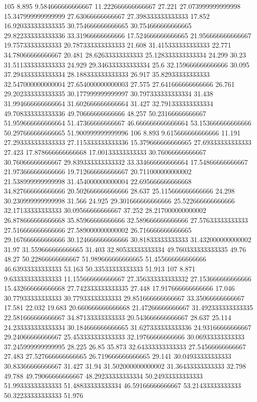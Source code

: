 105 8.895 9.584666666666667 11.222666666666667 27.221 27.073999999999998 15.347999999999999 27.63066666666667 27.398333333333333 17.852 16.920333333333335 30.754666666666665 30.754666666666665 29.822333333333336 33.31966666666666 17.524666666666665 21.956666666666667 19.75733333333333 20.787333333333333 21.608 31.415333333333333 22.771 34.78066666666667 20.481 28.62633333333333 25.128333333333334 24.299 30.23 31.511333333333333 24.929 29.346333333333334 25.6 32.159666666666666 30.095 37.294333333333334 28.188333333333333 26.917 35.82933333333333 32.547000000000004 27.654000000000003 27.575 27.641666666666666 26.761 29.202333333333335 30.177999999999997 30.797333333333334 31.438 31.994666666666664 31.602666666666664 31.427 32.791333333333334 49.708333333333336 49.70666666666666 48.257 50.23166666666667 51.959666666666664 51.47366666666667 46.666666666666664 53.153666666666666 50.297666666666665 51.900999999999996
106 8.893 9.615666666666666 11.191 27.293333333333333 27.115333333333336 15.379666666666665 27.69333333333333 27.423 17.878666666666668 17.00133333333333 30.76066666666667 30.76066666666667 29.839333333333332 33.334666666666664 17.54866666666667 21.973666666666666 19.712666666666667 20.711000000000002 21.538999999999998 31.454000000000004 22.695666666666668 34.827666666666666 20.502666666666666 28.637 25.115666666666666 24.298 30.230999999999998 31.566 24.925 29.301666666666666 25.522666666666666 32.17133333333333 30.09566666666667 37.252 28.217000000000002 26.878666666666668 35.85966666666666 32.589666666666666 27.57633333333333 27.516666666666666 27.589000000000002 26.716666666666665 29.167666666666666 30.124666666666666 30.81833333333333 31.432000000000002 31.97 31.559666666666665 31.403 32.80533333333334 49.760333333333335 49.76 48.27 50.22866666666667 51.989666666666665 51.455666666666666 46.63933333333333 53.163 50.33533333333333 51.913
107 8.871 9.633333333333333 11.155666666666667 27.356333333333332 27.153666666666666 15.432666666666668 27.742333333333335 27.448 17.917666666666666 17.046 30.77933333333333 30.77933333333333 29.851666666666667 33.35066666666667 17.581 22.032 19.683 20.660666666666668 21.47266666666667 31.492333333333335 22.581666666666667 34.87133333333333 20.543666666666667 28.637 25.114 24.233333333333334 30.184666666666665 31.627333333333336 24.93166666666667 29.24066666666667 25.453333333333333 32.19766666666666 30.06933333333333 37.245999999999995 28.225 26.85 35.873 32.64333333333333 27.54566666666667 27.483 27.527666666666665 26.719666666666665 29.141 30.04933333333333 30.83366666666667 31.427 31.94 31.502000000000002 31.36433333333333 32.798 49.788 49.79066666666667 48.29233333333334 50.24933333333333 51.99333333333333 51.48833333333334 46.59166666666667 53.21433333333333 50.32233333333333 51.976
